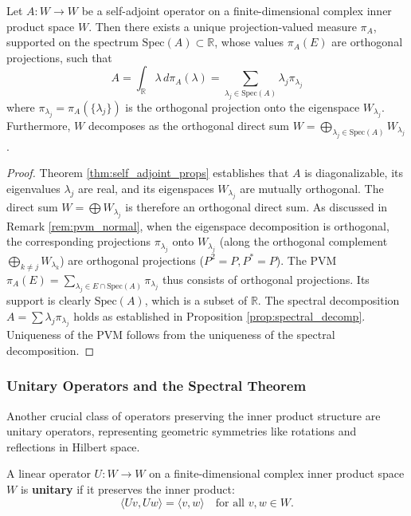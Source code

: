 \begin{theorem}
\label{thm:spectral_thm_sa}
Let $A: W \to W$ be a self-adjoint operator on a finite-dimensional complex inner product space $W$. Then there exists a unique projection-valued measure $\pi_A$, supported on the spectrum $\text{Spec}(A) \subset \mathbb{R}$, whose values $\pi_A(E)$ are orthogonal projections, such that
\[ A = \int_{\mathbb{R}} \lambda \, d\pi_A(\lambda) = \sum_{\lambda_j \in \text{Spec}(A)} \lambda_j \pi_{\lambda_j} \]
where $\pi_{\lambda_j} = \pi_A(\{\lambda_j\})$ is the orthogonal projection onto the eigenspace $W_{\lambda_j}$. Furthermore, $W$ decomposes as the orthogonal direct sum $W = \bigoplus_{\lambda_j \in \text{Spec}(A)} W_{\lambda_j}$.
\end{theorem}
\begin{proof}
Theorem \ref{thm:self_adjoint_props} establishes that $A$ is diagonalizable, its eigenvalues $\lambda_j$ are real, and its ei\-gen\-spa\-ces $W_{\lambda_j}$ are mutually orthogonal. The direct sum $W = \bigoplus W_{\lambda_j}$ is therefore an orthogonal direct sum. As discussed in Remark \ref{rem:pvm_normal}, when the eigenspace decomposition is orthogonal, the corresponding projections $\pi_{\lambda_j}$ onto $W_{\lambda_j}$ (along the orthogonal complement $\bigoplus_{k \neq j} W_{\lambda_k}$) are orthogonal projections ($P^2=P, P^*=P$). The PVM $\pi_A(E) = \sum_{\lambda_j \in E \cap \text{Spec}(A)} \pi_{\lambda_j}$ thus consists of orthogonal projections. Its support is clearly $\text{Spec}(A)$, which is a subset of $\mathbb{R}$. The spectral decomposition $A = \sum \lambda_j \pi_{\lambda_j}$ holds as established in Proposition \ref{prop:spectral_decomp}. Uniqueness of the PVM follows from the uniqueness of the spectral decomposition.
\end{proof}

\subsubsection{Unitary Operators and the Spectral Theorem}
\label{subsec:unitary}

Another crucial class of operators preserving the inner product structure are unitary operators, representing geometric symmetries like rotations and reflections in Hilbert space.

\begin{definition}
\label{def:unitary}
A linear operator $U: W \to W$ on a finite-dimensional complex inner product space $W$ is \textbf{unitary} if it preserves the inner product:
\[ \langle Uv, Uw \rangle = \langle v, w \rangle \quad \text{for all } v, w \in W. \]
\end{definition}

